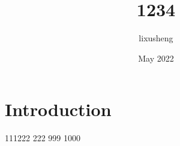 \documentclass{article}
\title{1234}
\author{lixusheng }
\date{May 2022}
\begin{document}
\maketitle

\section{Introduction}
111222
222
999
1000
\end{document}
